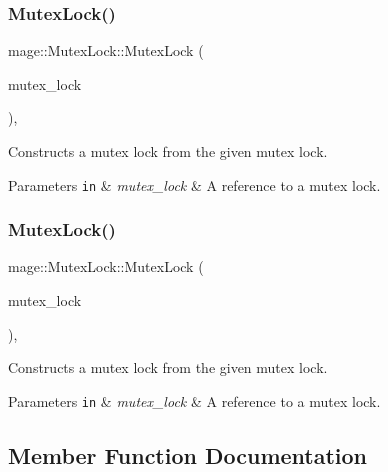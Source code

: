 \subsubsection{\texorpdfstring{Mutex\+Lock()}{MutexLock()}\hspace{0.1cm}{\footnotesize\ttfamily [2/3]}}
{\footnotesize\ttfamily mage\+::\+Mutex\+Lock\+::\+Mutex\+Lock (\begin{DoxyParamCaption}\item[{const \hyperlink{structmage_1_1_mutex_lock}{Mutex\+Lock} \&}]{mutex\+\_\+lock }\end{DoxyParamCaption})\hspace{0.3cm}{\ttfamily [private]}, {\ttfamily [delete]}}

Constructs a mutex lock from the given mutex lock.


\begin{DoxyParams}[1]{Parameters}
\mbox{\tt in}  & {\em mutex\+\_\+lock} & A reference to a mutex lock. \\
\hline
\end{DoxyParams}
\hypertarget{structmage_1_1_mutex_lock_a5045ffd6d3743b7994ba2ddfaf093a4a}{}\label{structmage_1_1_mutex_lock_a5045ffd6d3743b7994ba2ddfaf093a4a} 
\subsubsection{\texorpdfstring{Mutex\+Lock()}{MutexLock()}\hspace{0.1cm}{\footnotesize\ttfamily [3/3]}}
{\footnotesize\ttfamily mage\+::\+Mutex\+Lock\+::\+Mutex\+Lock (\begin{DoxyParamCaption}\item[{\hyperlink{structmage_1_1_mutex_lock}{Mutex\+Lock} \&\&}]{mutex\+\_\+lock }\end{DoxyParamCaption})\hspace{0.3cm}{\ttfamily [private]}, {\ttfamily [delete]}}

Constructs a mutex lock from the given mutex lock.


\begin{DoxyParams}[1]{Parameters}
\mbox{\tt in}  & {\em mutex\+\_\+lock} & A reference to a mutex lock. \\
\hline
\end{DoxyParams}


\subsection{Member Function Documentation}
\hypertarget{structmage_1_1_mutex_lock_a739909161a9a9ca0fc8143ac84967765}{}\label{structmage_1_1_mutex_lock_a739909161a9a9ca0fc8143ac84967765} 
